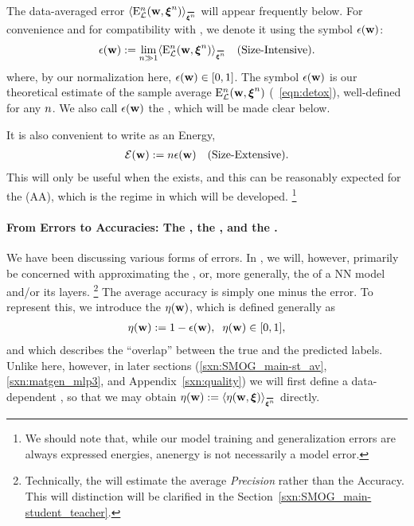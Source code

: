 The data-averaged error  $\langle \DETOPXI \rangle_{\AVGNDXIn}$ will appear frequently below.
For convenience and for compatibility with \cite{SST92}, we denote it using the symbol $\epsilon({\mathbf{w}})$:
\begin{align}
 \label{eqn:epsl}
 \EPSLw:=\lim_{n\gg 1}  \langle \DETOPXI \rangle_{\AVGNDXIn} \quad \text{(\SizeIntensive)}.
\end{align}
where, by our normalization here, $\epsilon({\mathbf{w}}) \in [0,1]$.
The symbol $\epsilon({\mathbf{w}})$ is our theoretical estimate of the sample average $\mathbf{\mathrm{E}}^{n}_{\mathcal{L}}(\mathbf{w}, \boldsymbol{\xi}^{n})$ (\EQN~\ref{eqn:detox}),
well-defined for any $n$.
We also call $\epsilon({\mathbf{w}})$ the \emph{\EffectivePotential}, which will be made clear below.

It is also convenient to write \emph{\TotalEffectivePotential} as an Energy, 
\begin{align}
 \label{eqn:detox}
 \mathcal{E}(\mathbf{w}) := n\epsilon({\mathbf{w}})\quad \text{(Size-Extensive)}.
\end{align}
This will only be useful when the \ThermodynamicLimit exists, and this
can be reasonably expected for the \AnnealedApproximation (AA),
which is the regime in which \SETOL will be developed.%
\footnote{We should note that, while our model training and generalization errors are always expressed energies, anenergy is not necessarily a model error. }


\paragraph{From Errors to Accuracies: The \AverageGeneralizationAccuracy, the \Quality, and the \SelfOverlap.}
We have been discussing various forms of errors.
In \SETOL, we will, however, primarily be concerned with approximating the \emph{\AverageGeneralizationAccuracy},
or, more generally, the \Quality of a NN model and/or its layers.
\footnote{Technically, the \Quality will estimate the average \emph{Precision} rather than the Accuracy.
This will distinction will be clarified in the Section~\ref{sxn:SMOG_main-student_teacher}.}
The average accuracy is simply one minus the error.
To represent this,
we introduce the \emph{\SelfOverlap} $\eta({\mathbf{w}})$, which is defined generally as
\begin{align}
 \label{eqn:def_eta}
 \eta({\mathbf{w}}) := 1 -\epsilon({\mathbf{w}}) ,\;\;\eta({\mathbf{w}})\in[0,1] ,
\end{align}
and which 
describes the ``overlap'' between the true and the predicted labels.
Unlike here, however, in later sections
(\ref{sxn:SMOG_main-st_av}, \ref{sxn:matgen_mlp3}, and Appendix~\ref{sxn:quality})
we will first define a data-dependent \SelfOverlap, so that we may obtain
 $\ETA(\WVEC):=\langle\ETA(\WVEC,\XI)\rangle_{\AVGNDXIn}$ directly.

